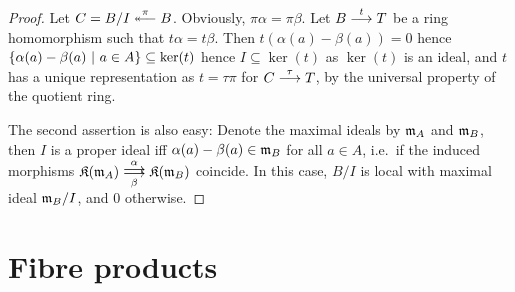\documentclass[a4paper,parskip=half,numbers=enddot, DIV=12]{scrreprt}
\begin{document}
	\begin{proof}
        Let $C = B/I \lepimorphism[\pi] B$. Obviously, $\pi \alpha = \pi\beta$. Let $B\morphism[t] T$ be a ring homomorphism such that $t\alpha = t\beta$. Then $t(\alpha(a)-\beta(a)) = 0$ hence $\left\{\alpha(a)-\beta(a)\ \middle|\  a\in A\right\} \subseteq \ker(t)$ hence $I\subseteq \ker(t)$ as $\ker(t)$ is an ideal, and $t$ has a unique representation as $t=\tau\pi$ for $C\morphism[\tau] T$, by the universal property of the quotient ring.
        
        The second assertion is also easy: Denote the maximal ideals by $\mathfrak{m}_A$ and $\mathfrak{m}_B$, then $I$ is a proper ideal iff $\alpha(a)-\beta(a)\in\mathfrak{m}_B$ for all $a\in A$, i.e.\ if the induced morphisms $\KK(\mm_A)\doublemorphism[\alpha][\smash{\beta}]\KK(\mm_B)$ coincide. In this case, $B/I$ is local with maximal ideal $\mathfrak{m}_B/I$, and $0$ otherwise.
	\end{proof}
	

\section{Fibre products}
\end{document}
